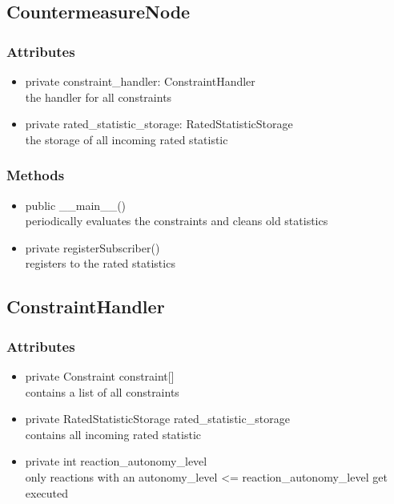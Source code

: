 \subsection{CountermeasureNode}
\subsubsection{Attributes}
\begin{itemize}
	\item  private constraint\_handler: ConstraintHandler\\
		the handler for all constraints
	\item  private rated\_statistic\_storage: RatedStatisticStorage\\
		the storage of all incoming rated statistic
\end{itemize}
\subsubsection{Methods}
\begin{itemize}
	\item  public __main__()\\
		periodically evaluates the constraints and cleans old statistics
	\item private registerSubscriber()\\
		registers to the rated statistics
\end{itemize}



\subsection{ConstraintHandler}
\subsubsection{Attributes}
\begin{itemize}
	\item private  Constraint constraint[]\\
		contains a list of all constraints
	\item private  RatedStatisticStorage rated\_statistic\_storage\\
		contains all incoming rated statistic
	\item private  int reaction\_autonomy\_level\\
		only reactions with an autonomy\_level <= reaction\_autonomy\_level get executed
\end{itemize}

